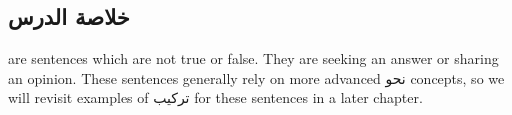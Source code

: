 \documentclass[../main.tex]{subfiles}
\begin{document}
\subsection{خلاصة الدرس}

\begin{english}
     are sentences which are not true or false. They are seeking an answer or sharing an opinion. These sentences generally rely on more advanced \textarabic{نحو} concepts, so we will revisit examples of \textarabic{تركيب} for these sentences in a later chapter.
\end{english}
\end{document}
